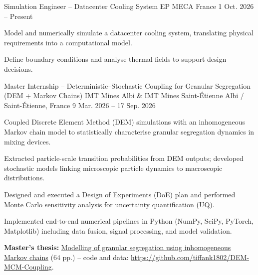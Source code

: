 \documentclass[11pt, a4paper]{awesome-cv}
\begin{document}
\begin{cventries}

  \cventry
    {Simulation Engineer – Datacenter Cooling System}
    {EP MECA}
    {France}
    {1 Oct. 2026 -- Present}
    {
      \begin{cvitems}
        \item Model and numerically simulate a datacenter cooling system, translating physical requirements into a computational model.
        \item Define boundary conditions and analyse thermal fields to support design decisions.
      \end{cvitems}
    }

  \cventry
    {Master Internship – Deterministic–Stochastic Coupling for Granular Segregation (DEM + Markov Chains)}
    {IMT Mines Albi \& IMT Mines Saint-\'Etienne}
    {Albi / Saint-Étienne, France}
    {9 Mar. 2026 -- 17 Sep. 2026}
    {
      \begin{cvitems}
        \item Coupled Discrete Element Method (DEM) simulations with an inhomogeneous Markov chain model to statistically characterise granular segregation dynamics in mixing devices.
        \item Extracted particle-scale transition probabilities from DEM outputs; developed stochastic models linking microscopic particle dynamics to macroscopic distributions.
        \item Designed and executed a Design of Experiments (DoE) plan and performed Monte Carlo sensitivity analysis for uncertainty quantification (UQ).
        \item Implemented end-to-end numerical pipelines in Python (NumPy, SciPy, PyTorch, Matplotlib) including data fusion, signal processing, and model validation.
        \item \textbf{Master's thesis:} \href{https://tiffank1802.github.io/rapports/rapport-stage-dem-mcm.pdf}{\underline{Modelling of granular segregation using inhomogeneous Markov chains}} (64 pp.) -- code and data: \url{https://github.com/tiffank1802/DEM-MCM-Coupling}.
      \end{cvitems}
    }


\end{cventries}
\end{document}
